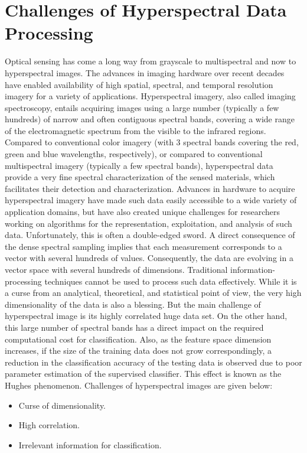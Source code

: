 \documentclass[document.tex]{subfiles}
\begin{document}
\section{Challenges of Hyperspectral Data Processing}
Optical sensing has come a long way from grayscale to multispectral and now to hyperspectral images. The advances in imaging hardware over recent decades have enabled availability of high spatial, spectral, and temporal resolution imagery for a variety of applications. Hyperspectral imagery, also
called imaging spectroscopy, entails acquiring images using a
large number (typically a few hundreds) of narrow and often
contiguous spectral bands, covering a wide range of the electromagnetic spectrum from the visible to the infrared regions.
Compared to conventional color imagery (with 3 spectral bands
covering the red, green and blue wavelengths, respectively),
or compared to conventional multispectral imagery (typically
a few spectral bands), hyperspectral data provide a very fine
spectral characterization of the sensed materials, which facilitates their detection and characterization. Advances in hardware to acquire hyperspectral imagery have
made such data easily accessible to a wide variety of application domains, but have also created unique challenges for
researchers working on algorithms for the representation, exploitation, and analysis of such data. Unfortunately, this is often
a double-edged sword. A direct consequence of the dense spectral sampling implies that each measurement corresponds to a
vector with several hundreds of values. Consequently, the data
are evolving in a vector space with several hundreds of dimensions. Traditional information-processing techniques cannot be
used to process such data effectively. While it is a curse from an
analytical, theoretical, and statistical point of view, the very high
dimensionality of the data is also a blessing. But the main challenge of hyperspectral image is its highly correlated huge data set. On the other hand, this large number of spectral bands has a direct impact on the required computational cost for classification. Also, as the feature space dimension increases, if the size of the training data does not grow correspondingly, a reduction in the classification accuracy of the testing data is observed due to poor parameter estimation of the supervised classifier. This effect is known as the Hughes phenomenon\cite{1}. Challenges of hyperspectral images are given below:
\begin{itemize}
	\item Curse of dimensionality.
	\item High correlation.
	\item Irrelevant information for classification.
\end{itemize}
\end{document}
